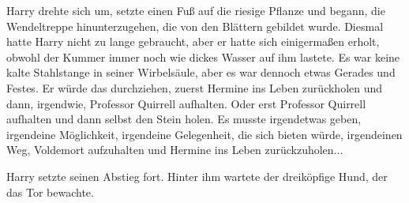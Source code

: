 Harry drehte sich um, setzte einen Fuß auf die riesige Pflanze und begann, die
Wendeltreppe hinunterzugehen, die von den Blättern gebildet wurde. Diesmal hatte
Harry nicht zu lange gebraucht, aber er hatte sich einigermaßen erholt, obwohl
der Kummer immer noch wie dickes Wasser auf ihm lastete. Es war keine kalte
Stahlstange in seiner Wirbelsäule, aber es war dennoch etwas Gerades und Festes.
Er würde das durchziehen, zuerst Hermine ins Leben zurückholen und dann,
irgendwie, Professor Quirrell aufhalten. Oder erst Professor Quirrell aufhalten
und dann selbst den Stein holen. Es musste irgendetwas geben, irgendeine
Möglichkeit, irgendeine Gelegenheit, die sich bieten würde, irgendeinen Weg,
Voldemort aufzuhalten und Hermine ins Leben zurückzuholen...

Harry setzte seinen Abstieg fort. Hinter ihm wartete der dreiköpfige Hund, der
das Tor bewachte.


